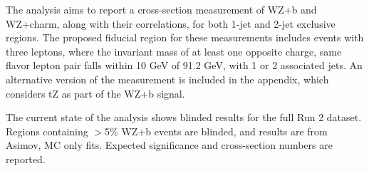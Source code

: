 The analysis aims to report a cross-section measurement of WZ+b and WZ+charm, along with their correlations, for both 1-jet and 2-jet exclusive regions. The proposed fiducial region for these measurements includes events with three leptons, where the invariant mass of at least one opposite charge, same flavor lepton pair falls within 10 GeV of 91.2 GeV, with 1 or 2 associated jets. An alternative version of the measurement is included in the appendix, which considers tZ as part of the WZ+b signal.

The current state of the analysis shows blinded results for the full Run 2 dataset. Regions containing $>$5\% WZ+b events are blinded, and results are from Asimov, MC only fits. Expected significance and cross-section numbers are reported.
